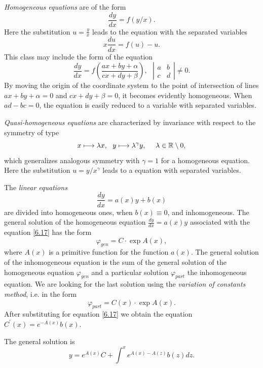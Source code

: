 \begin{example}
	\emph{Homogeneous equations} are of the form
	$$
	\frac{dy}{dx}=f\left( y/x\right).
	$$
	Here the substitution $u=\frac{y}{x}$ leads to the equation with the separated variables
	$$
	x\frac{du}{dx}=f(u)-u.
	$$
	This class may include the form of the equation
	$$
	\frac{dy}{dx}=f\left( \frac{ax+by+\alpha }{cx+dy+\beta }\right) ,\text{ \ \ }%
	\left\vert
	\begin{array}{cc}
	a & b \\
	c & d%
	\end{array}%
	\right\vert \not=0.
	$$
	By moving the origin of the coordinate system to the point of intersection of lines $ax+by+\alpha =0$ and $cx+dy+\beta =0$, it becomes evidently homogeneous. When $ad-bc=0$, the equation is easily reduced to a variable with separated variables.
\end{example}

\begin{example}
	\emph{Quasi-homogeneous equations} are characterized by invariance with respect to the symmetry of type
	$$
	x\longmapsto \lambda x,\text{ \ }y\longmapsto \lambda ^{\gamma }y,\text{ \ \
		\ }\lambda \in \mathbb{R}\setminus 0,
	$$
	which generalizes analogous symmetry with $\gamma =1$ for a homogeneous equation. Here the substitution $u=y/x^{\gamma }$ leads to a equation with separated variables.
\end{example}

\begin{example}
	The \emph{linear equations}
	\begin{equation}
	\label{6.17}
	\frac{dy}{dx}=a(x)y+b(x)
	\end{equation}
	are divided into homogeneous ones, when $b(x)\equiv 0$, and inhomogeneous. The general solution of the homogeneous equation $\frac{dy}{dx}=a(x)y$ associated with the equation \eqref{6.17} has the form
	$$
	\varphi _{gen}=C\cdot \exp A(x),
	$$
	where $A (x)$ is a primitive function for the function $a (x)$. The general solution of the inhomogeneous equation is the sum of the general solution of the homogeneous equation $\varphi _{gen}$ and a particular solution $\varphi _{part}$ the inhomogeneous equation. We are looking for the last solution using the \emph{variation of constants method}, i.e. in the form
	$$
	\varphi _{part}=C(x)\cdot \exp A(x).
	$$
	After substituting for equation \eqref{6.17} we obtain the equation
	$C^{\prime
	}(x)=e^{-A(x)}b(x)$.
	
	The general solution is
	\begin{equation}
	\label{6.18}
	y=e^{A(x)}C+\int^{x}e^{A(x)-A(z)}b(z)dz.
	\end{equation}
\end{example}

